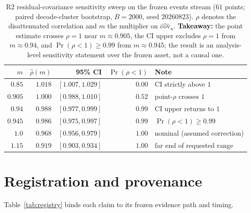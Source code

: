 \documentclass{article}
\begin{document}
\begin{table}[h!]
\caption{R2 residual-covariance sensitivity sweep on the frozen events stream ($61$ points;
paired decode-cluster bootstrap, $B=2000$, seed $20260823$).  $\rho$ denotes the disattenuated
correlation and $m$ the multiplier on $\widehat{\mathrm{cov}}_u$.  \textbf{Takeaway:} the point
estimate crosses $\rho=1$ near $m\approx0.905$, the CI upper excludes $\rho=1$ from $m\approx
0.94$, and $\Pr(\rho<1)\ge0.99$ from $m\approx0.945$; the result is an analysis-level
sensitivity statement over the frozen asset, not a causal one.}
\label{tab:r2sweep}
\centering\footnotesize
\setlength{\tabcolsep}{4pt}
\begin{tabularx}{\linewidth}{@{}rrrr>{\raggedright\arraybackslash}X@{}}
\toprule
$m$ & $\widehat{\rho}(m)$ & 95\% CI & $\Pr(\rho<1)$ & Note \\
\midrule
$0.85$ & $1.018$ & $[1.007,1.029]$ & $0.00$ & CI strictly above $1$ \\
$0.905$ & $1.000$ & $[0.988,1.010]$ & $0.52$ & point-$\rho$ crosses $1$ \\
$0.94$ & $0.988$ & $[0.977,0.999]$ & $0.99$ & CI upper returns to $1$ \\
$0.945$ & $0.986$ & $[0.975,0.997]$ & $0.99$ & $\Pr(\rho<1)\ge0.99$ \\
$1.0$ & $0.968$ & $[0.956,0.979]$ & $1.00$ & nominal (assumed correction) \\
$1.15$ & $0.919$ & $[0.903,0.934]$ & $1.00$ & far end of requested range \\
\bottomrule
\end{tabularx}
\end{table}

\section{Registration and provenance}
\label{app:registry}

Table~\ref{tab:registry} binds each claim to its frozen evidence path and timing.
\end{document}
